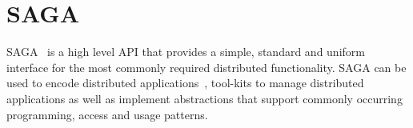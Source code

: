 \documentclass[conference,final]{IEEEtran}
\begin{document}

\section{SAGA}


SAGA~\cite{saga-core} is a high level API that provides a simple,
standard and uniform interface for the most commonly required
distributed functionality.  SAGA can be used to encode distributed
applications~\cite{saga_escience07_short, saga_tg08}, tool-kits to
manage distributed applications as well as implement abstractions that
support commonly occurring programming, access and usage patterns.
\end{document}
